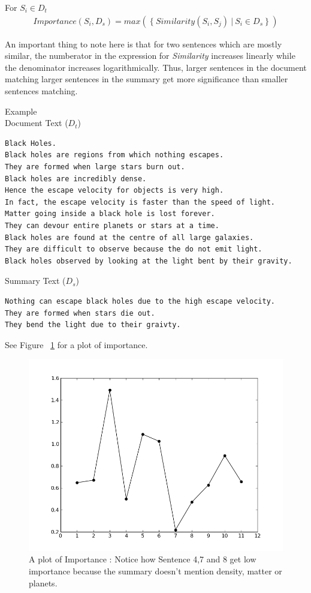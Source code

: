 \documentclass[paper=a4, fontsize=11pt]{scrartcl} %
\numberwithin{equation}{section} %
\numberwithin{figure}{section} %
\numberwithin{table}{section} %
\begin{document}
For $S_i \in D_t$ 
\begin{align}
Importance(S_i,D_s) = max(\ \{\ Similarity(S_i,S_j)\ |\ S_i \in D_s\ \}\ )  
\end{align}

An important thing to note here is that for two sentences which are mostly similar, the numberator in the expression for \emph{Similarity} increases linearly while the denominator increases logarithmically. Thus, larger sentences in the document matching larger sentences in the  summary get more significance than smaller sentences matching.\\
\par
{{\large Example}} \\
{Document Text ($D_t$)}
\begin{lstlisting}
Black Holes.
Black holes are regions from which nothing escapes.
They are formed when large stars burn out.
Black holes are incredibly dense.
Hence the escape velocity for objects is very high.
In fact, the escape velocity is faster than the speed of light.
Matter going inside a black hole is lost forever.
They can devour entire planets or stars at a time.
Black holes are found at the centre of all large galaxies.
They are difficult to observe because the do not emit light.
Black holes observed by looking at the light bent by their gravity.
\end{lstlisting}
 \vspace{1.2em}
{Summary Text ($D_s$)}
\begin{lstlisting}
Nothing can escape black holes due to the high escape velocity.
They are formed when stars die out.
They bend the light due to their graivty.
\end{lstlisting}
See Figure ~\ref{fig:importance} for a plot of importance.

\begin{figure}[h!]
  \centering
    \includegraphics[width=.8\textwidth]{images/importance}
    \caption{A plot of Importance : Notice how Sentence 4,7 and 8 get low importance because the summary doesn't mention density, matter or planets.}
    \label{fig:importance}
\end{figure}
\pagebreak
\end{document}
